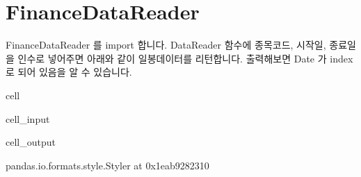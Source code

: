\documentclass[letterpaper,10pt,english]{jupyterBook}
\begin{document}
\section{FinanceDataReader}
\label{\detokenize{chapter2/2.2.4_Useful_Techniques:financedatareader}}
\sphinxAtStartPar
FinanceDataReader 를 import 합니다. DataReader 함수에 종목코드, 시작일, 종료일을 인수로 넣어주면 아래와 같이 일봉데이터를 리턴합니다. 출력해보면 Date 가 index 로 되어 있음을 알 수 있습니다.

\begin{sphinxuseclass}{cell}\begin{sphinxVerbatimInput}

\begin{sphinxuseclass}{cell_input}
\begin{sphinxVerbatim}[commandchars=\\\{\}]
   

   
     

 
\end{sphinxVerbatim}

\end{sphinxuseclass}\end{sphinxVerbatimInput}
\begin{sphinxVerbatimOutput}

\begin{sphinxuseclass}{cell_output}
\begin{sphinxVerbatim}[commandchars=\\\{\}]
\PYGZlt{}pandas.io.formats.style.Styler at 0x1eab9282310\PYGZgt{}
\end{sphinxVerbatim}

\end{sphinxuseclass}\end{sphinxVerbatimOutput}

\end{sphinxuseclass}
\end{document}
